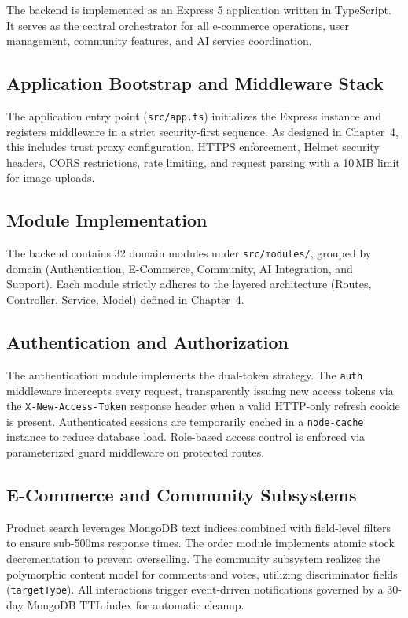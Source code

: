The backend is implemented as an Express 5 application written in TypeScript. It serves as the central orchestrator for all e-commerce operations, user management, community features, and AI service coordination.

\subsection{Application Bootstrap and Middleware Stack}
The application entry point (\texttt{src/app.ts}) initializes the Express instance and registers middleware in a strict security-first sequence. As designed in Chapter~4, this includes trust proxy configuration, HTTPS enforcement, Helmet security headers, CORS restrictions, rate limiting, and request parsing with a 10\,MB limit for image uploads.

\subsection{Module Implementation}
The backend contains 32 domain modules under \texttt{src/modules/}, grouped by domain (Authentication, E-Commerce, Community, AI Integration, and Support). Each module strictly adheres to the layered architecture (Routes, Controller, Service, Model) defined in Chapter~4.

\subsection{Authentication and Authorization}
The authentication module implements the dual-token strategy. The \texttt{auth} middleware intercepts every request, transparently issuing new access tokens via the \texttt{X-New-Access-Token} response header when a valid HTTP-only refresh cookie is present. Authenticated sessions are temporarily cached in a \texttt{node-cache} instance to reduce database load. Role-based access control is enforced via parameterized guard middleware on protected routes.

\subsection{E-Commerce and Community Subsystems}
Product search leverages MongoDB text indices combined with field-level filters to ensure sub-500ms response times. The order module implements atomic stock decrementation to prevent overselling. The community subsystem realizes the polymorphic content model for comments and votes, utilizing discriminator fields (\texttt{targetType}). All interactions trigger event-driven notifications governed by a 30-day MongoDB TTL index for automatic cleanup.

